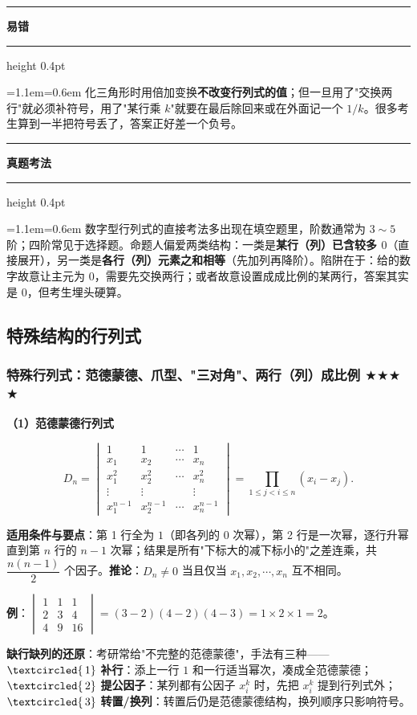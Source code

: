 \documentclass[11pt,openany,UTF8]{ctexbook}
\newcommand{\circled}[1]{\textcircled{\scriptsize\,#1}}
\newcommand{\callouthead}[2]{%
  \par\addvspace{7pt}\noindent
  {\color{#1}\rule[-0.15em]{3pt}{1.05em}}\hspace{0.5em}%
  {\bfseries\color{#1}#2}\par\nobreak\vspace{-0.35em}%
  {\color{rulesep}\hrule height 0.4pt}\nobreak\vspace{0.45em}%
  \begingroup\small\setlength{\parindent}{0pt}%
  \leftskip=1.1em\rightskip=0.6em\noindent\ignorespaces}
\newcommand{\calloutend}{\par\endgroup\addvspace{7pt}}
\newenvironment{callwarn}[1]{\callouthead{warnbar}{#1}}{\calloutend}
\newenvironment{callexam}[1]{\callouthead{exambar}{#1}}{\calloutend}
\begin{document}
\begin{callwarn}{易错}
化三角形时用倍加变换\textbf{不改变行列式的值}；但一旦用了"交换两行"就必须补符号，用了"某行乘 $k$"就要在最后除回来或在外面记一个 $1/k$。很多考生算到一半把符号丢了，答案正好差一个负号。

\end{callwarn}

\begin{callexam}{真题考法}
数字型行列式的直接考法多出现在填空题里，阶数通常为 $3\sim 5$ 阶；四阶常见于选择题。命题人偏爱两类结构：一类是\textbf{某行（列）已含较多 $0$}（直接展开），另一类是\textbf{各行（列）元素之和相等}（先加列再降阶）。陷阱在于：给的数字故意让主元为 $0$，需要先交换两行；或者故意设置成成比例的某两行，答案其实是 $0$，但考生埋头硬算。

\end{callexam}

\subsection{特殊结构的行列式}

\subsubsection{特殊行列式：范德蒙德、爪型、"三对角"、两行（列）成比例 $\bigstar$$\bigstar$$\bigstar$$\bigstar$}

\textbf{（1）范德蒙德行列式}

\[D_n=\begin{vmatrix}1&1&\cdots&1\\x_1&x_2&\cdots&x_n\\x_1^2&x_2^2&\cdots&x_n^2\\\vdots&\vdots&&\vdots\\x_1^{n-1}&x_2^{n-1}&\cdots&x_n^{n-1}\end{vmatrix}=\prod_{1\le j<i\le n}(x_i-x_j).\]

\textbf{适用条件与要点}：第 1 行全为 $1$（即各列的 $0$ 次幂），第 2 行是一次幂，逐行升幂直到第 $n$ 行的 $n-1$ 次幂；结果是所有"下标大的减下标小的"之差连乘，共 $\dfrac{n(n-1)}{2}$ 个因子。\textbf{推论}：$D_n\ne0$ 当且仅当 $x_1,x_2,\cdots,x_n$ 互不相同。

\textbf{例}：$\begin{vmatrix}1&1&1\\2&3&4\\4&9&16\end{vmatrix}=(3-2)(4-2)(4-3)=1\times2\times1=2$。

\textbf{缺行缺列的还原}：考研常给"不完整的范德蒙德"，手法有三种——$\circled{1}$ \textbf{补行}：添上一行 $1$ 和一行适当幂次，凑成全范德蒙德；$\circled{2}$ \textbf{提公因子}：某列都有公因子 $x_i^{k}$ 时，先把 $x_i^k$ 提到行列式外；$\circled{3}$ \textbf{转置/换列}：转置后仍是范德蒙德结构，换列顺序只影响符号。
\end{document}
